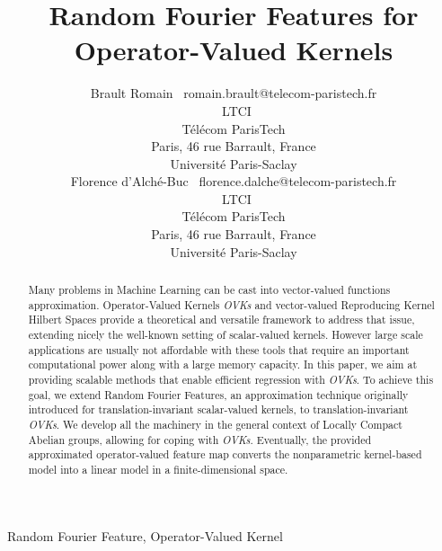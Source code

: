 \documentclass[twoside,11pt]{article}
\begin{document}
\title{Random Fourier Features for Operator-Valued Kernels}

\author{\name{}Brault Romain
       \email~romain.brault@telecom-paristech.fr \\
       \addr~LTCI\\
       T\'el\'ecom ParisTech\\
       Paris, 46 rue Barrault, France \\
       Universit\'e Paris-Saclay \\
       \AND%
       \name{}Florence d'Alch\'e-Buc
       \email~florence.dalche@telecom-paristech.fr \\
       \addr~LTCI\\
       T\'el\'ecom ParisTech\\
       Paris, 46 rue Barrault, France \\
       Universit\'e Paris-Saclay}


\maketitle

\begin{abstract}%
    Many problems in Machine Learning can be cast into
    vector-valued functions approximation. Operator-Valued Kernels
    \emph{\acl{OVK}s} and vector-valued Reproducing Kernel Hilbert Spaces
    provide a theoretical and versatile framework to address that issue,
    extending nicely the well-known setting of scalar-valued kernels.
    However large scale applications are usually not affordable with these
    tools that require an important computational power along with a large
    memory capacity. In this paper, we aim at providing scalable methods
that enable efficient regression with \emph{\acl{OVK}s}. To achieve this goal, we
    extend Random Fourier Features, an approximation technique originally
    introduced for translation-invariant scalar-valued kernels, to translation-invariant \emph{\acl{OVK}s}. We develop all the machinery in the general context of Locally Compact Abelian groups, allowing for coping with  \emph{\acl{OVK}s}. Eventually,  the provided approximated operator-valued feature map converts the nonparametric kernel-based model into a linear model in a finite-dimensional space. 
\end{abstract}
\begin{keywords}
    Random Fourier Feature, Operator-Valued Kernel
\end{keywords}
\end{document}
